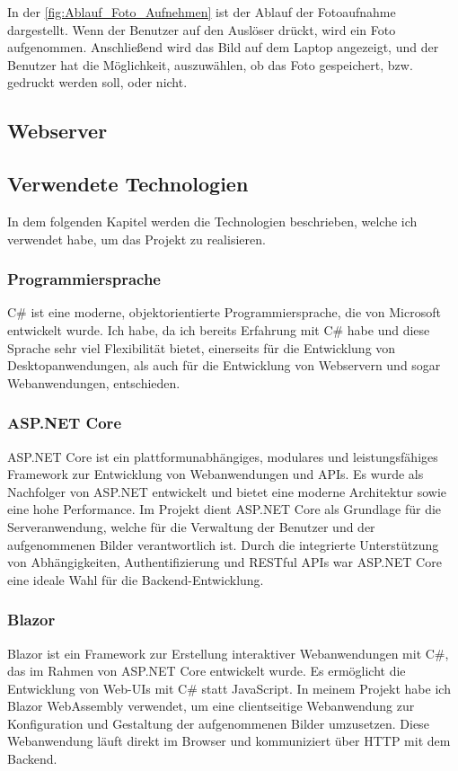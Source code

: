 In der \autoref{fig:Ablauf_Foto_Aufnehmen} ist der Ablauf der Fotoaufnahme dargestellt.
Wenn der Benutzer auf den Auslöser drückt, wird ein Foto aufgenommen.
Anschließend wird das Bild auf dem Laptop angezeigt, und der Benutzer hat die Möglichkeit,
auszuwählen, ob das Foto gespeichert, bzw. gedruckt werden soll, oder nicht.

\newpage

\subsection{Webserver}

\newpage

\subsection{Verwendete Technologien}

In dem folgenden Kapitel werden die Technologien beschrieben, welche ich verwendet habe,
um das Projekt zu realisieren.

\subsubsection{Programmiersprache}
C\# ist eine moderne, objektorientierte Programmiersprache, die von Microsoft entwickelt wurde.
Ich habe, da ich bereits Erfahrung mit C\# habe und diese Sprache sehr viel Flexibilität bietet,
einerseits für die Entwicklung von Desktopanwendungen, als auch für die Entwicklung
von Webservern und sogar Webanwendungen, entschieden.

\subsubsection{ASP.NET Core}
ASP.NET Core ist ein plattformunabhängiges, modulares und leistungsfähiges
Framework zur Entwicklung von Webanwendungen und APIs. Es wurde als Nachfolger
von ASP.NET entwickelt und bietet eine moderne Architektur sowie eine hohe
Performance. Im Projekt dient ASP.NET Core als Grundlage für die Serveranwendung,
welche für die Verwaltung der Benutzer und der aufgenommenen Bilder verantwortlich ist.
Durch die integrierte Unterstützung von Abhängigkeiten, Authentifizierung und RESTful
APIs war ASP.NET Core eine ideale Wahl für die Backend-Entwicklung.

\subsubsection{Blazor}
Blazor ist ein Framework zur Erstellung interaktiver Webanwendungen mit C\#,
das im Rahmen von ASP.NET Core entwickelt wurde. Es ermöglicht die Entwicklung
von Web-UIs mit C\# statt JavaScript. In meinem Projekt habe ich Blazor WebAssembly
verwendet, um eine clientseitige Webanwendung zur Konfiguration und Gestaltung
der aufgenommenen Bilder umzusetzen. Diese Webanwendung läuft direkt im Browser
und kommuniziert über HTTP mit dem Backend.

